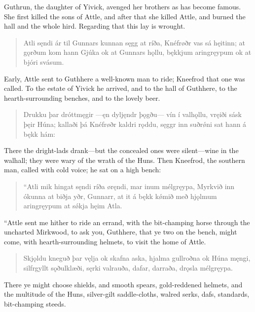 \bookStart

Guthrun, the daughter of Yivick, avenged her brothers as has become famous. She first killed the sons of Attle, and after that she killed Attle, and burned the hall and the whole hird. Regarding that this lay is wrought.

\begin{verse}
\bva Atli sęndi \hld ár til Gunnars
kunnan sęgg at ríða, \hld Knéfrøðr vas sá hęitinn;
at gǫrðum kom hann Gjúka \hld ok at Gunnars hǫllu,
bękkjum aringręypum \hld ok at bjóri svásum. 
\end{verse}

\bvb Early, Attle sent to Guthhere a well-known man to ride; Kneefrod that one was called. To the estate of Yivick he arrived, and to the hall of Guthhere, to the hearth-surrounding benches, and to the lovely beer.

\begin{verse}
\bva Drukku þar dróttmęgir \hld —ęn dyljęndr þǫgðu—
vín í valhǫllu, \hld vręiði sásk þęir Húna;
kallaði þá Knéfrøðr \hld kaldri rǫddu,
sęggr inn suðrǿni \hld sat hann á bękk hám: 
\end{verse}

\bvb There the dright-lads drank—but the concealed ones were silent—wine in the walhall; they were wary of the wrath of the Huns. Then Kneefrod, the southern man, called with cold voice; he sat on a high bench:

\begin{verse}
\bva “Atli mik hingat sęndi \hld ríða øręndi,
mar inum mélgręypa, \hld Myrkvið inn ókunna
at biðja yðr, Gunnarr, \hld at it á bękk kǿmið
með hjǫlmum aringręypum \hld at sǿkja hęim Atla. 
\end{verse}

\bvb “Attle sent me hither to ride an errand, with the bit-champing horse through the uncharted Mirkwood, to ask you, Guthhere, that ye two on the bench, might come, with hearth-surrounding helmets, to visit the home of Attle.

\begin{verse}
\bva Skjǫldu kneguð þar vęlja \hld ok skafna aska,
hjalma gullroðna \hld ok Húna męngi,
silfrgyllt sǫðulklæði, \hld sęrki valrauða,
dafar, darraða, \hld drǫsla mélgręypa. 
\end{verse}

\bvb There ye might choose shields, and smooth spears, gold-reddened helmets, and the multitude of the Huns, silver-gilt saddle-cloths, walred serks, dafs, standards, bit-champing steeds.

